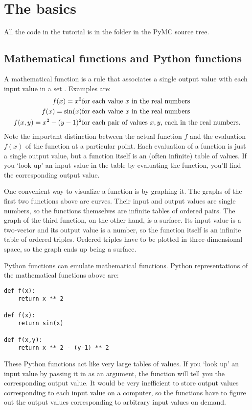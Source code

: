 
\chapter{The basics}\label{cha:basics} %

All the code in the tutorial is in the folder  in the PyMC source tree.

\section{Mathematical functions and Python functions}\label{sec:functions}
A mathematical function is a rule that associates a single output value with each input value in a set \cite{rudin}. Examples are:
\begin{eqnarray*}
    f(x) = x^2 & \textup{for each value $x$ in the real numbers}  \\
    f(x) = \sin(x)& \textup{for each value $x$ in the real numbers}\\
    f(x,y) = x^2 - (y-1)^2 & \textup{for each pair of values $x,y$, each in the real numbers.}
\end{eqnarray*}
Note the important distinction between the actual function $f$ and the evaluation $f(x)$ of the function at a particular point. Each evaluation of a function is just a single output value, but a function itself is an (often infinite) table of values. If you `look up' an input value in the table by evaluating the function, you'll find the corresponding output value.

One convenient way to visualize a function is by graphing it. The graphs of the first two functions above are curves. Their input and output values are single numbers, so the functions themselves are infinite tables of ordered pairs. The graph of the third function, on the other hand, is a surface. Its input value is a two-vector and its output value is a number, so the function itself is an infinite table of ordered triples. Ordered triples have to be plotted in three-dimensional space, so the graph ends up being a surface.

Python functions can emulate mathematical functions. Python representations of the mathematical functions above are:
\begin{verbatim}
def f(x):
    return x ** 2

def f(x):
    return sin(x)

def f(x,y):
    return x ** 2 - (y-1) ** 2
\end{verbatim}
These Python functions act like very large tables of values. If you `look up' an input value by passing it in as an argument, the function will tell you the corresponding output value. It would be very inefficient to store output values corresponding to each input value on a computer, so the functions have to figure out the output values corresponding to arbitrary input values on demand.


